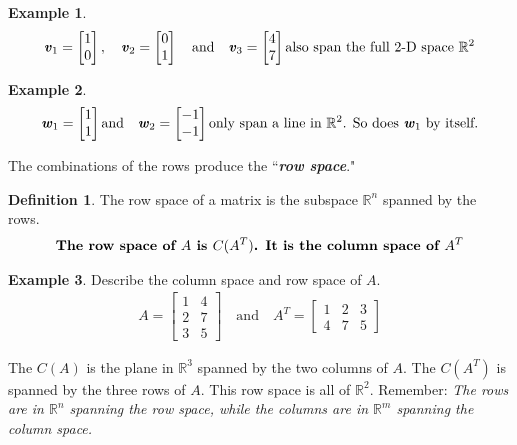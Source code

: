 \documentclass[12pt, letterpaper]{article}
\newcommand{\R}[1]{$\mathbb{R}^{#1}$}
\newcommand{\V}[1]{\textbf{\textit{#1}}}
\theoremstyle{definition}
\newtheorem{definition}{Definition}[section]
\newtheorem{example}{Example}
\begin{document}
					\begin{example}
						\begin{gather*}
							\V{v}_1 = \begin{bmatrix}1 \\ 0 \end{bmatrix}, \quad \V{v}_2 = \begin{bmatrix}0 \\ 1 \end{bmatrix} \quad \text{and} \quad \V{v}_3 = \begin{bmatrix}4\\ 7 \end{bmatrix} \text{also span the full 2-D space \R{2}}
						\end{gather*}
					\end{example}
				
					\begin{example}
						\begin{gather*}
							\V{w}_1 = \begin{bmatrix}1 \\ 1 \end{bmatrix} \text{and} \quad \V{w}_2 = \begin{bmatrix}-1 \\ -1 \end{bmatrix} \text{only span a line in \R{2}. So does $\V{w}_1$ by itself.}
						\end{gather*}
					\end{example}
	
	
		
	\noindent The combinations of the rows produce the ``\textbf{\textit{row space}}."
		\begin{definition}
			The row space of a matrix is the subspace \R{n} spanned by the rows.
				\begin{gather*}
					\text{\textbf{The row space of $A$ is $C(A^T)$. It is the column space of $A^T$}}
				\end{gather*}
		\end{definition}
	
				\begin{example}
					Describe the column space and row space of $A$.
					\begin{gather*}
					A = \begin{bmatrix}1&4\\ 2&7 \\ 3&5 \end{bmatrix} \quad \text{and} \quad A^T = \begin{bmatrix}1&2&3 \\ 4&7&5\end{bmatrix}
					\end{gather*}
					
					The $C(A)$ is the plane in \R{3} spanned by the two columns of $A$. The $C(A^T)$ is spanned by the three rows of $A$. This row space is all of \R{2}. Remember: \textit{The rows are in \R{n} spanning the row space, while the columns are in \R{m} spanning the column space.}
				\end{example}
	
\end{document}

